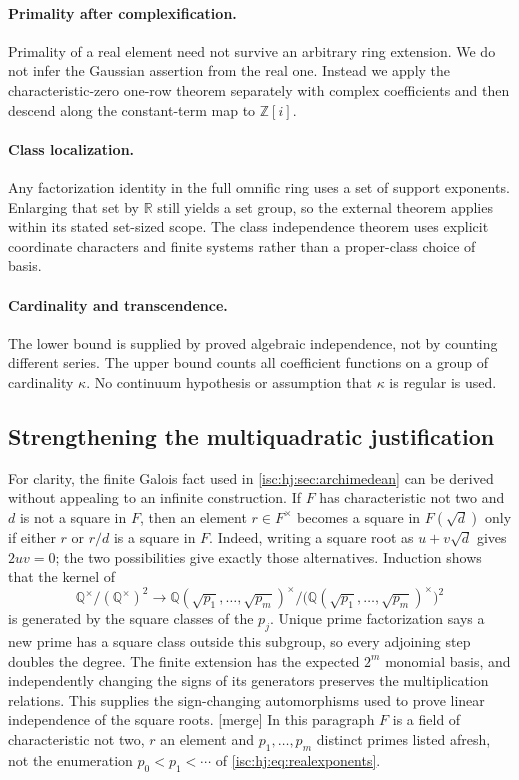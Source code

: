 \documentclass[11pt,letterpaper]{article}
\theoremstyle{definition}
\theoremstyle{remark}
\newcommand{\R}{\mathbb R}
\newcommand{\Q}{\mathbb Q}
\newcommand{\Z}{\mathbb Z}
\newcommand{\mtag}{\textup{[merge]}}%
\numberwithin{equation}{section}
\begin{document}
\paragraph{Primality after complexification.}
Primality of a real element need not survive an arbitrary ring
extension. We do not infer the Gaussian assertion from the real one.
Instead we apply the characteristic-zero one-row theorem separately
with complex coefficients and then descend along the constant-term
map to $\Z[i]$.

\paragraph{Class localization.}
Any factorization identity in the full omnific ring uses a set of
support exponents. Enlarging that set by $\R$ still yields a set group,
so the external theorem applies within its stated set-sized scope.
The class independence theorem uses explicit coordinate characters and
finite systems rather than a proper-class choice of basis.

\paragraph{Cardinality and transcendence.}
The lower bound is supplied by proved algebraic independence, not by
counting different series. The upper bound counts all coefficient
functions on a group of cardinality $\kappa$. No continuum hypothesis
or assumption that $\kappa$ is regular is used.

\subsection{Strengthening the multiquadratic justification}

For clarity, the finite Galois fact used in \cref{isc:hj:sec:archimedean}
can be derived without appealing to an infinite construction. If $F$ has
characteristic not two and $d$ is not a square in $F$, then an element
$r\in F^\times$ becomes a square in $F(\sqrt d)$ only if either $r$ or
$r/d$ is a square in $F$. Indeed, writing a square root as $u+v\sqrt d$
gives $2uv=0$; the two possibilities give exactly those alternatives.
Induction shows that the kernel of
\[
 \Q^\times/(\Q^\times)^2\longrightarrow
 \Q(\sqrt{p_1},\ldots,\sqrt{p_m})^\times/
 \bigl(\Q(\sqrt{p_1},\ldots,\sqrt{p_m})^\times\bigr)^2
\]
is generated by the square classes of the $p_j$. Unique prime
factorization says a new prime has a square class outside this subgroup,
so every adjoining step doubles the degree. The finite extension has
the expected $2^m$ monomial basis, and independently changing the signs
of its generators preserves the multiplication relations. This supplies
the sign-changing automorphisms used to prove linear independence of
the square roots.
\mtag{} In this paragraph $F$ is a field of characteristic not two, $r$ an
element and $p_1,\ldots,p_m$ distinct primes listed afresh, not the
enumeration $p_0<p_1<\cdots$ of \eqref{isc:hj:eq:realexponents}.
\end{document}
